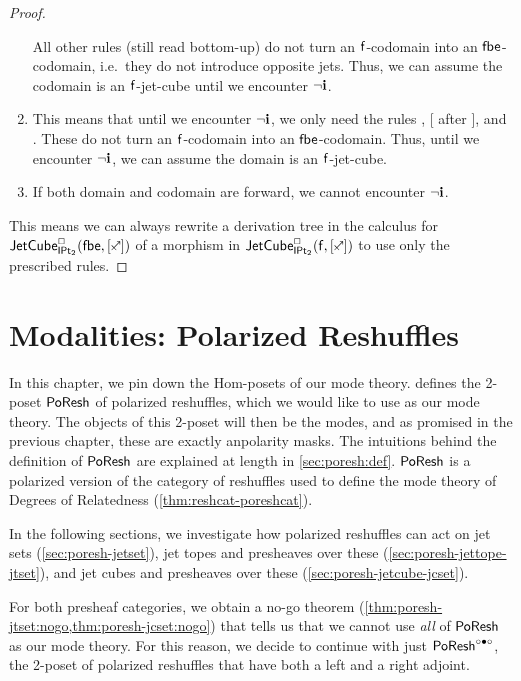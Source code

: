 \documentclass[a4paper]{memoir}
\begin{document}
\begin{proof}
\begin{enumerate}
		All other rules (still read bottom-up) do not turn an ${\mathsf{f}}$-codomain into an ${\mathsf{fbe}}$-codomain, i.e.\ they do not introduce opposite jets.
		Thus, we can assume the codomain is an ${\mathsf{f}}$-jet-cube until we encounter $\lnot \mathbf{i}$.
		\item This means that until we encounter $\lnot \mathbf{i}$, we only need the rules , [ after ],  and .
		These do not turn an ${\mathsf{f}}$-codomain into an ${\mathsf{fbe}}$-codomain. Thus, until we encounter $\lnot \mathbf{i}$, we can assume the domain is an ${\mathsf{f}}$-jet-cube.
		\item If both domain and codomain are forward, we cannot encounter $\lnot \mathbf{i}$.
	\end{enumerate}
	This means we can always rewrite a derivation tree in the calculus for $\jetcubetri \affine \bipointedsym {[\ypolar]}$ of a morphism in $\jetcubefwd \affine \bipointedsym {[\ypolar]}$ to use only the prescribed rules. 
\end{proof}

\chapter{Modalities: Polarized Reshuffles} \label{ch:modalities}
In this chapter, we pin down the Hom-posets of our mode theory.
 defines the 2-poset $\mathsf{PoResh}$ of polarized reshuffles, which we would like to use as our mode theory. The objects of this 2-poset will then be the modes, and as promised in the previous chapter, these are exactly anpolarity masks.
The intuitions behind the definition of $\mathsf{PoResh}$ are explained at length in \cref{sec:poresh:def}.
$\mathsf{PoResh}$ is a polarized version of the category of reshuffles used to define the mode theory of Degrees of Relatedness \cite{reldtt,reldtt-techreport} (\cref{thm:reshcat-poreshcat}).

In the following sections, we investigate how polarized reshuffles can act on jet sets (\cref{sec:poresh-jetset}), jet topes and presheaves over these  (\cref{sec:poresh-jettope-jtset}), and jet cubes and presheaves over these (\cref{sec:poresh-jetcube-jcset}).

For both presheaf categories, we obtain a no-go theorem (\cref{thm:poresh-jtset:nogo,thm:poresh-jcset:nogo}) that tells us that we cannot use \emph{all} of $\mathsf{PoResh}$ as our mode theory. For this reason, we decide to continue with just $\mathsf{PoResh}^{\circ \bullet \circ}$, the 2-poset of polarized reshuffles that have both a left and a right adjoint.
\end{document}
